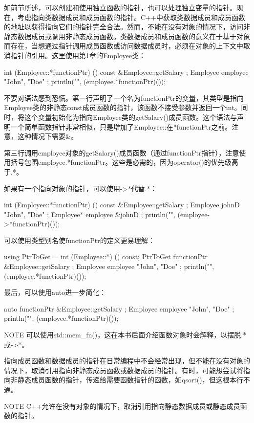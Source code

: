 如前节所述，可以创建和使用独立函数的指针，也可以处理独立变量的指针。现在，考虑指向类数据成员和成员函数的指针。C++中获取类数据成员和成员函数的地址以获得指向它们的指针完全合法。然而，不能在没有对象的情况下，访问非静态数据成员或调用非静态成员函数。类数据成员和成员函数的意义在于基于对象而存在，当想通过指针调用成员函数或访问数据成员时，必须在对象的上下文中取消指针的引用。这里使用第1章的Employee类：

\begin{cpp}
int (Employee::*functionPtr) () const { &Employee::getSalary };
Employee employee { "John", "Doe" };
println("{}", (employee.*functionPtr)());
\end{cpp}

不要对语法感到恐慌。第一行声明了一个名为functionPtr的变量，其类型是指向Employee类的非静态const成员函数的指针，该函数不接受参数并返回一个int。同时，将这个变量初始化为指向Employee类的getSalary()成员函数。这个语法与声明一个简单函数指针非常相似，只是增加了Employee::在*functionPtr之前。注意，这种情况下需要\&。

第三行调用employee对象的getSalary()成员函数（通过functionPtr指针），注意使用括号包围employee.*functionPtr。这些是必需的，因为operator()的优先级高于.*。

如果有一个指向对象的指针，可以使用->*代替.*：

\begin{cpp}
int (Employee::*functionPtr) () const { &Employee::getSalary };
Employee johnD { "John", "Doe" };
Employee* employee { &johnD };
println("{}", (employee->*functionPtr)());
\end{cpp}

可以使用类型别名使functionPtr的定义更易理解：

\begin{cpp}
using PtrToGet = int (Employee::*) () const;
PtrToGet functionPtr { &Employee::getSalary };
Employee employee { "John", "Doe" };
println("{}", (employee.*functionPtr)());
\end{cpp}

最后，可以使用auto进一步简化：

\begin{cpp}
auto functionPtr { &Employee::getSalary };
Employee employee { "John", "Doe" };
println("{}", (employee.*functionPtr)());
\end{cpp}

\begin{myNotic}{NOTE}
可以使用std::mem\_fn()，这在本书后面介绍函数对象时会解释，以摆脱.*或->*。
\end{myNotic}

指向成员函数和数据成员的指针在日常编程中不会经常出现，但不能在没有对象的情况下，取消引用指向非静态成员函数或数据成员的指针。有时，可能想尝试将指向非静态成员函数的指针，传递给需要函数指针的函数，如qsort()，但这根本行不通。

\begin{myNotic}{NOTE}
C++允许在没有对象的情况下，取消引用指向静态数据成员或静态成员函数的指针。
\end{myNotic}













